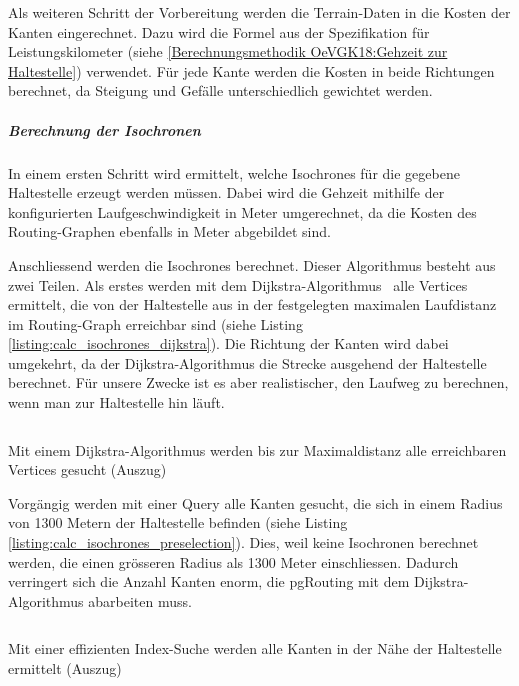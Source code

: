 Als weiteren Schritt der Vorbereitung werden die Terrain-Daten in die Kosten der Kanten eingerechnet.
Dazu wird die Formel aus der Spezifikation für Leistungskilometer (siehe \ref{Berechnungsmethodik OeVGK18:Gehzeit zur Haltestelle}) verwendet.
Für jede Kante werden die Kosten in beide Richtungen berechnet, da Steigung und Gefälle unterschiedlich gewichtet werden.

\subparagraph{Berechnung der Isochronen}
In einem ersten Schritt wird ermittelt, welche \glspl{Isochrone} für die gegebene Haltestelle erzeugt werden müssen.
Dabei wird die Gehzeit mithilfe der konfigurierten Laufgeschwindigkeit in Meter umgerechnet, da die Kosten des Routing-Graphen ebenfalls in Meter abgebildet sind.

Anschliessend werden die \glspl{Isochrone} berechnet.
Dieser Algorithmus besteht aus zwei Teilen.
Als erstes werden mit dem Dijkstra-Algorithmus~\cite{dijkstra_algorithm} alle Vertices ermittelt, die von der Haltestelle aus in der festgelegten maximalen Laufdistanz im Routing-Graph erreichbar sind (siehe Listing \ref{listing:calc_isochrones_dijkstra}).
Die Richtung der Kanten wird dabei umgekehrt, da der Dijkstra-Algorithmus die Strecke ausgehend der Haltestelle berechnet.
Für unsere Zwecke ist es aber realistischer, den Laufweg zu berechnen, wenn man zur Haltestelle hin läuft.

\begin{listing}[ht]
    \inputminted{sql}{projectdoc/listing/calc_isochrones_dijkstra.sql}
    \caption[Dijkstra-Algorithmus zur Berechnung von Isochronen]{Mit einem Dijkstra-Algorithmus werden bis zur Maximaldistanz alle erreichbaren Vertices gesucht (Auszug)}
    \label{listing:calc_isochrones_dijkstra}
\end{listing}

Vorgängig werden mit einer Query alle Kanten gesucht, die sich in einem Radius von 1300 Metern der Haltestelle befinden (siehe Listing \ref{listing:calc_isochrones_preselection}).
Dies, weil keine Isochronen berechnet werden, die einen grösseren Radius als 1300 Meter einschliessen.
Dadurch verringert sich die Anzahl Kanten enorm, die pgRouting mit dem Dijkstra-Algorithmus abarbeiten muss.

\begin{listing}[ht]
    \inputminted{sql}{projectdoc/listing/calc_isochrones_preselection.sql}
    \caption[Vorselektion der Kanten für die Berechnung von Isochronen]{Mit einer effizienten Index-Suche werden alle Kanten in der Nähe der Haltestelle ermittelt (Auszug)}
    \label{listing:calc_isochrones_preselection}
\end{listing}

